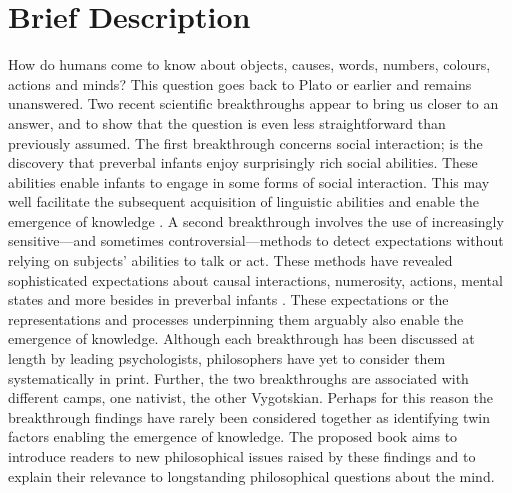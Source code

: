 \documentclass[12pt,\papersize]{extarticle}
\date{}
\begin{document}
\setlength\footnotesep{1em}




\maketitle

\setcounter{secnumdepth}{-1} 



\section{Brief Description}
How do humans come to know about %
objects,
causes,
words,
numbers,
colours,
actions
and
minds? 
This question goes back to Plato or earlier and remains unanswered.
Two recent scientific breakthroughs appear to bring us closer to an answer, and to show that the question is even less straightforward than previously  assumed.
The first breakthrough concerns social interaction;
is the discovery that preverbal infants enjoy surprisingly rich social abilities.
These abilities enable infants to engage in some forms of social interaction. 
This may well facilitate the subsequent acquisition of linguistic abilities and enable the emergence of knowledge \citep[e.g.][]{Csibra:2009xr,Meltzoff:2007pj,Tomasello:2005wx}. 
A second breakthrough involves the use of increasingly sensitive---and sometimes controversial---methods to detect  expectations without relying on subjects' abilities to talk or act.  
These methods have revealed sophisticated expectations about  causal interactions, numerosity, actions, mental states and more besides in preverbal infants \citep[e.g.][]{Spelke:1990jn,Baillargeon:gx}.
These expectations or the representations and processes underpinning them arguably also enable the emergence of knowledge. 
Although each breakthrough has been discussed at length by leading psychologists, philosophers have yet to consider them systematically in print.
Further, the two breakthroughs are associated with different camps, one nativist, the other Vygotskian.
Perhaps for this reason the breakthrough findings have rarely been considered together as identifying twin factors enabling the emergence of knowledge.
The proposed book aims to introduce readers to  
new philosophical issues raised by these findings  
and to explain their relevance to longstanding philosophical questions about the mind.  
\end{document}
